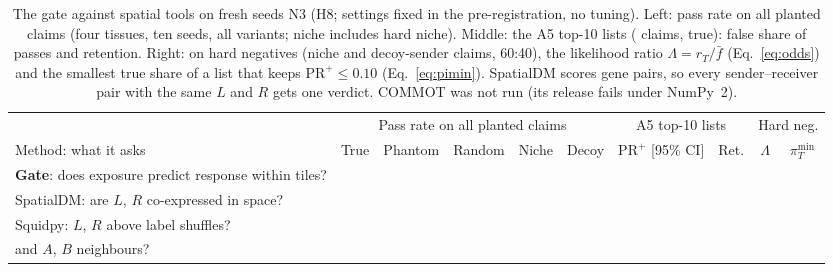 \documentclass[letterpaper]{article} %
\begin{document}
\begin{table}[t]
\centering
\small
\setlength{\tabcolsep}{4pt}
\begin{tabular}{@{}p{4.5cm}ccccccccc@{}}
\toprule
 & \multicolumn{5}{c}{Pass rate on all planted claims} & \multicolumn{2}{c}{A5 top-10 lists} &
   \multicolumn{2}{c}{Hard neg.} \\
\cmidrule(lr){2-6}\cmidrule(lr){7-8}\cmidrule(l){9-10}
Method: what it asks & True & Phantom & Random & Niche & Decoy & $\mathrm{PR}^{+}$ [95\% CI] & Ret.
  & $\Lambda$ & $\pi_T^{\min}$ \\
\midrule
\textbf{Gate}: does exposure predict response within tiles?
  & \pcGateTrue{} & \pcGatePhantom{} & \pcGateRandom{} & \pcGateNiche{} & \pcGateDecoy{}
  & \textbf{\sbGateFPS{}} {\footnotesize\sbGateFPSci{}} & \sbGateRet{} & \oddsGateLrHard{} & \oddsGatePiMinHard{} \\
SpatialDM: are $L$, $R$ co-expressed in space?
  & \pcSpatialdmTrue{} & \pcSpatialdmPhantom{} & \pcSpatialdmRandom{} & \pcSpatialdmNiche{} & \pcSpatialdmDecoy{}
  & \sbSpatialdmFPS{} {\footnotesize\sbSpatialdmFPSci{}} & \sbSpatialdmRet{} & \oddsSpatialdmLrHard{}
  & \oddsSpatialdmPiMinHard{} \\
Squidpy: $L$, $R$ above label shuffles?
  & \pcLigrecTrue{} & \pcLigrecPhantom{} & \pcLigrecRandom{} & \pcLigrecNiche{} & \pcLigrecDecoy{}
  & \sbLigrecFPS{} {\footnotesize\sbLigrecFPSci{}} & \sbLigrecRet{} & \oddsLigrecLrHard{} & \oddsLigrecPiMinHard{} \\
\quad and $A$, $B$ neighbours?
  & \pcNhoodTrue{} & \pcNhoodPhantom{} & \pcNhoodRandom{} & \pcNhoodNiche{} & \pcNhoodDecoy{}
  & \sbNhoodFPS{} {\footnotesize\sbNhoodFPSci{}} & \sbNhoodRet{} & \oddsNhoodLrHard{} & \oddsNhoodPiMinHard{} \\
\bottomrule
\end{tabular}
\caption{The gate against spatial tools on fresh seeds N3 (H8; settings fixed in the pre-registration, no tuning).
Left: pass rate on all planted claims (four tissues, ten seeds, all variants; niche includes hard niche). Middle: the A5
top-10 lists (\hfourNthreeAfiveN{} claims, \hfourNthreeAfiveNtrue{} true): false share of passes and retention.
Right: on hard negatives (niche and decoy-sender claims, 60:40), the likelihood ratio $\Lambda=r_T/\bar f$
(Eq.~\ref{eq:odds}) and the smallest true share of a list that keeps $\mathrm{PR}^{+}\leq0.10$ (Eq.~\ref{eq:pimin}).
SpatialDM scores gene pairs, so every sender--receiver pair with the same $L$ and $R$ gets one verdict. COMMOT was not
run (its release fails under NumPy~2).}
\label{tab:spatial}
\end{table}
\end{document}
